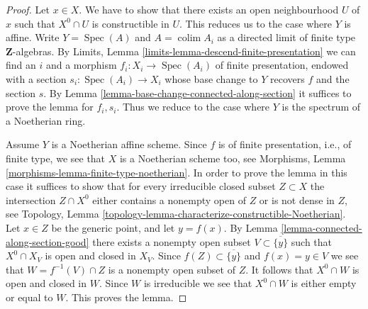 \documentclass[10pt,a4paper]{amsart}
\theoremstyle{plain}
\theoremstyle{definition}
\theoremstyle{remark}
\numberwithin{equation}{subsection}
\def\colim{\mathop{\mathrm{colim}}\nolimits}
\def\Spec{\mathop{\mathrm{Spec}}}
\begin{document}
\begin{proof}
Let $x \in X$. We have to show that there exists an open neighbourhood
$U$ of $x$ such that $X^0 \cap U$ is constructible in $U$.
This reduces us to the case where $Y$ is affine.
Write $Y = \Spec(A)$ and $A = \colim A_i$ as a directed
limit of finite type $\mathbf{Z}$-algebras. By
Limits, Lemma \ref{limits-lemma-descend-finite-presentation}
we can find an $i$ and a morphism $f_i : X_i \to \Spec(A_i)$ of
finite presentation, endowed with a section $s_i : \Spec(A_i) \to X_i$
whose base change to $Y$ recovers $f$ and the section $s$. By
Lemma \ref{lemma-base-change-connected-along-section}
it suffices to prove the lemma for $f_i, s_i$. Thus we reduce to
the case where $Y$ is the spectrum of a Noetherian ring.

\medskip\noindent
Assume $Y$ is a Noetherian affine scheme. Since $f$ is of finite presentation,
i.e., of finite type, we see that $X$ is a Noetherian scheme too, see
Morphisms, Lemma \ref{morphisms-lemma-finite-type-noetherian}.
In order to prove the lemma in
this case it suffices to show that for every irreducible closed subset
$Z \subset X$ the intersection $Z \cap X^0$ either contains a nonempty
open of $Z$ or is not dense in $Z$, see
Topology, Lemma \ref{topology-lemma-characterize-constructible-Noetherian}.
Let $x \in Z$ be the generic point, and let $y = f(x)$. By
Lemma \ref{lemma-connected-along-section-good}
there exists a nonempty open subset $V \subset \overline{\{y\}}$ such
that $X^0 \cap X_V$ is open and closed in $X_V$. Since
$f(Z) \subset \overline{\{y\}}$ and $f(x) = y \in V$ we see that
$W = f^{-1}(V) \cap Z$ is a nonempty open subset of $Z$. It follows that
$X^0 \cap W$ is open and closed in $W$. Since $W$ is irreducible
we see that $X^0 \cap W$ is either empty or equal to $W$.
This proves the lemma.
\end{proof}
\end{document}
